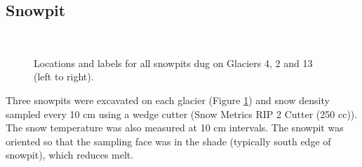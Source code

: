 \documentclass{sfuthesis}
\begin{document}
\subsection{Snowpit}
\label{sec:snowpit}

\begin{figure}
	\centering
	\\
	\caption{Locations and labels for all snowpits dug on Glaciers 4, 2 and 13 (left to right).}
	\label{fig:snowpit_location_all}
	\end{figure}

Three snowpits were excavated on each glacier (Figure \ref{fig:snowpit_location_all}) and snow density sampled every 10 cm using a wedge cutter (Snow Metrics RIP 2 Cutter (250 cc)). The snow temperature was also measured at 10 cm intervals. The snowpit was oriented so that the sampling face was in the shade (typically south edge of snowpit), which reduces melt. 
\end{document}
